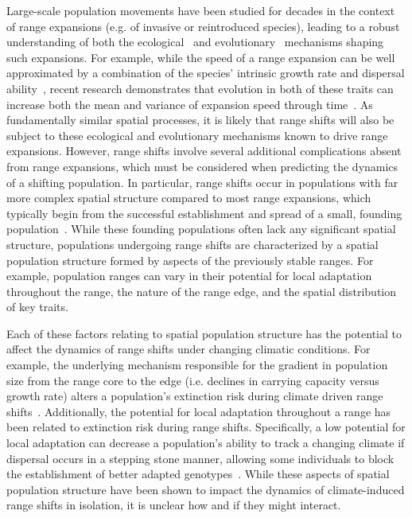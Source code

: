 \documentclass[11pt]{article}
\begin{document}
Large-scale population movements have been studied for decades in the context of range expansions (e.g. of invasive or reintroduced species), leading to a robust understanding of both the ecological~\citep{hastings2005spatial} and evolutionary~\citep{shine2011evolutionary, excoffier2009genetic} mechanisms shaping such expansions. For example, while the speed of a range expansion can be well approximated by a combination of the species' intrinsic growth rate and dispersal ability~\citep{hastings2005spatial}, recent research demonstrates that evolution in both of these traits can increase both the mean and variance of expansion speed through time~\citep{weiss2017rapid, ochocki2017rapid, szHucs2017rapid, shaw2015dispersal, phillips2015evolutionary}. As fundamentally similar spatial processes, it is likely that range shifts will also be subject to these ecological and evolutionary mechanisms known to drive range expansions. However, range shifts involve several additional complications absent from range expansions, which must be considered when predicting the dynamics of a shifting population. In particular, range shifts occur in populations with far more complex spatial structure compared to most range expansions, which typically begin from the successful establishment and spread of a small, founding population~\citep{hastings2005spatial}. While these founding populations often lack any significant spatial structure, populations undergoing range shifts are characterized by a spatial population structure formed by aspects of the previously stable ranges. For example, population ranges can vary in their potential for local adaptation throughout the range, the nature of the range edge, and the spatial distribution of key traits. 

Each of these factors relating to spatial population structure has the potential to affect the dynamics of range shifts under changing climatic conditions. For example, the underlying mechanism responsible for the gradient in population size from the range core to the edge (i.e. declines in carrying capacity versus growth rate) alters a population's extinction risk during climate driven range shifts~\citep{henry2013eco}. Additionally, the potential for local adaptation throughout a range has been related to extinction risk during range shifts. Specifically, a low potential for local adaptation can decrease a population's ability to track a changing climate if dispersal occurs in a stepping stone manner, allowing some individuals to block the establishment of better adapted genotypes~\citep{atkins2010local}. While these aspects of spatial population structure have been shown to impact the dynamics of climate-induced range shifts in isolation, it is unclear how and if they might interact. 
\end{document}
